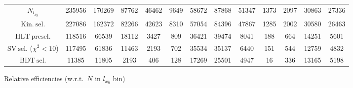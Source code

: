 \documentclass[10pt,a4paper]{article}
\begin{document}
\begin{landscape}
{\begin{tabular}{c|cccc|cccc|cccc}
\midrule
$N_{l_{xy}}$ & 235956 & 170269 & 87762 & 46462 & 9649 & 58672 & 87868 & 51347 & 1373 & 2097 & 30863 & 27336\\
$\mathrm{Kin.\ sel.}$ & 227086 & 162372 & 82266 & 42623 & 8310 & 57054 & 84396 & 47867 & 1285 & 2002 & 30580 & 26463\\
$\mathrm{HLT\ presel.}$ & 118516 & 66539 & 18112 & 3427 & 809 & 36421 & 39474 & 8041 & 188 & 664 & 14251 & 5601\\
$\mathrm{SV\ sel.}$ ($\chi^2{<}10$) & 117495 & 61836 & 11463 & 2193 & 702 & 35534 & 35137 & 6440 & 151 & 544 & 12759 & 4832\\
$\mathrm{BDT\ sel.}$ & 11385 & 11805 & 2193 & 406 & 128 & 17269 & 25501 & 4947 & 16 & 336 & 13165 & 5198\\
\bottomrule
\end{tabular}}

\vspace{18pt}

Relative efficiencies (w.r.t.\ $N$ in $l_{xy}$ bin)


\end{landscape}
\end{document}
